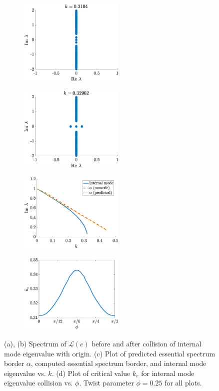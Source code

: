 \documentclass[11pt,reqno]{amsart}
\def\calL{{\mathcal L}}
\begin{document}
\begin{figure}
    \centering
    \begin{subfigure}{0.4\linewidth}
        \caption{}
        \label{fig:phi0speca}
        \includegraphics[width=5cm]{phi025spec2.eps}
    \end{subfigure}
    \begin{subfigure}{0.4\linewidth}
        \caption{}
        \label{fig:phi0specb}
        \includegraphics[width=5cm]{phi025spec3.eps}
    \end{subfigure}
    \begin{subfigure}{0.4\linewidth}
        \caption{}
        \label{fig:phi0specc}
        \includegraphics[width=5cm]{phi025speck.eps}
    \end{subfigure}
    \begin{subfigure}{0.4\linewidth}
        \caption{}
        \label{fig:phi0specd}
        \includegraphics[width=5cm]{keplot.eps}
    \end{subfigure}
    \caption{(a), (b) Spectrum of $\calL(c)$ before and after collision of internal mode eigenvalue with origin. (c) Plot of predicted essential spectrum border $\alpha$, computed essential spectrum border, and internal mode eigenvalue vs. $k$. (d) Plot of critical value $k_e$ for internal mode eigenvalue collision vs. $\phi$. Twist parameter $\phi = 0.25$ for all plots.}
    \label{fig:phi0spec}
\end{figure}
\end{document}
